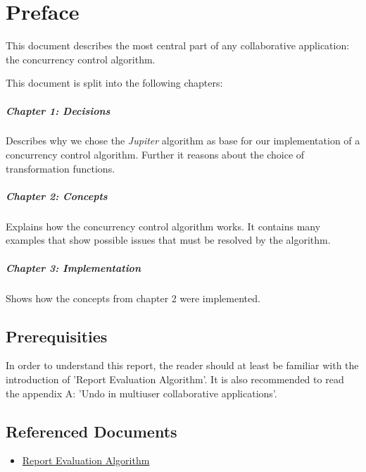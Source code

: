 \chapter*{Preface}
This document describes the most central part of any collaborative application: the concurrency control algorithm.

This document is split into the following chapters:

\paragraph{Chapter 1: Decisions} Describes why we chose the \emph{Jupiter} algorithm as base for our implementation of a concurrency control algorithm. Further it reasons about the choice of transformation functions.

\paragraph{Chapter 2: Concepts} Explains how the concurrency control algorithm works. It contains many examples that show possible issues that must be resolved by the algorithm.

\paragraph{Chapter 3: Implementation} Shows how the concepts from chapter 2 were implemented.

\section*{Prerequisities}
In order to understand this report, the reader should at least be familiar with the introduction of 'Report Evaluation Algorithm'. It is also recommended to read the appendix A: 'Undo in multiuser collaborative applications'.

\section*{Referenced Documents}
\begin{itemize}
 \item \href{http://ace.iserver.ch:81/repos/ace/ace/trunk/docs/pdf/algorithm.pdf}{Report Evaluation Algorithm}
\end{itemize}
